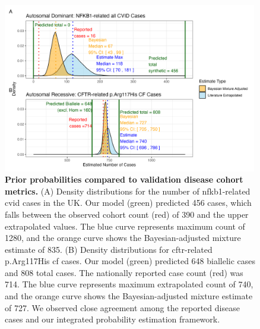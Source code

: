 \begin{figure}[ht]
  \centering
  \includegraphics[width=0.99\textwidth]{../images/validation_studies_bayesian_adjusted_estimates.png}
  \caption{\textbf{Prior probabilities compared to validation disease cohort metrics.}
  (A) Density distributions for the number of \ac{nfkb1}-related \ac{cvid} cases in the UK. 
  Our model (green) predicted 456 cases, which falls between the observed cohort count (red) of 390 and the upper extrapolated values.
  The blue curve represents maximum count of 1280, and the orange curve shows the Bayesian-adjusted mixture estimate of 835. 
(B) Density distributions for \ac{cftr}-related p.Arg117His \ac{cf} cases. 
Our model (green) predicted 648 biallelic cases and 808 total cases.
The nationally reported case count (red) was 714.
The blue curve represents maximum extrapolated count of 740, and the orange curve shows the Bayesian-adjusted mixture estimate of 727. We observed close agreement among the reported disease cases and our integrated probability estimation framework.}
  \label{fig:validation_studies_bayesian_adjusted_estimates}
\end{figure}

